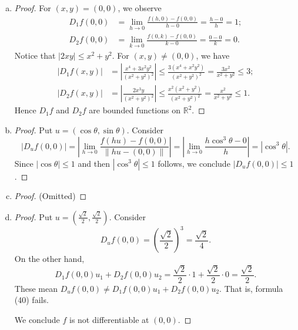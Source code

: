 \begin{Exercise}
	\begin{enumerate}[(a)]
		\item 		
		\begin{proof}
			For $(x,y) = (0,0)$, we observe
			\begin{align*}
			D_1 f(0,0) 
			&= \lim_{h\to 0} \frac{f(h,0)-f(0,0)}{h-0} 
			= \frac{h-0}{h} 
			= 1; \\
			D_2 f(0,0) 
			&= \lim_{k\to 0} \frac{f(0,k)-f(0,0)}{k-0} 
			= \frac{0-0}{k} 
			= 0.
			\end{align*}
			Notice that $|2xy| \leq x^2+y^2$.
			For $(x,y) \neq (0,0)$, we have
			\begin{align*}
			|D_1 f(x,y)|
			&= \left| \frac{x^4+3x^2 y^2}{(x^2+y^2)^2} \right|
			\leq \frac{3(x^4+x^2 y^2)}{(x^2+y^2)^2}
			= \frac{3x^2}{x^2+y^2}
			\leq 3; \\
			|D_2 f(x,y)|
			&= \left| \frac{2x^3 y}{(x^2+y^2)^2} \right|
			\leq \frac{x^2(x^2+y^2)}{(x^2+y^2)^2}
			= \frac{x^2}{x^2+y^2}
			\leq 1.
			\end{align*}
			Hence $D_1 f$ and $D_2 f$ are bounded functions on $\mathbb{R}^2$.
		\end{proof}
		
		\item
		\begin{proof}
			Put $u = (\cos \theta, \sin \theta)$.
			Consider
			$$
			|D_u f(0,0)|
			= \left| \lim_{h\to 0}\frac{f(hu) - f(0,0)}{\|hu - (0,0) \|}\right|
			= \left| \lim_{h\to 0} \frac{h\cos^3 \theta - 0}{h} \right|
			= |\cos^3 \theta|.
			$$
			Since $|\cos\theta|\leq 1$ and then $|\cos^3 \theta| \leq 1$ follows, we conclude $|D_u f(0,0)|\leq 1$.
		\end{proof}
		
		\item
		\begin{proof}
			(Omitted)
		\end{proof}
		
		\item
		\begin{proof}
			Put $u = \left(\frac{\sqrt{2}}{2}, \frac{\sqrt{2}}{2}\right)$.
			Consider
			$$
			D_u f(0,0) = \left(\frac{\sqrt{2}}{2}\right)^3
			= \frac{\sqrt{2}}{4}.
			$$
			On the other hand,
			$$
			D_1 f(0,0) u_1 + D_2 f(0,0) u_2
			= \frac{\sqrt{2}}{2}\cdot 1 + \frac{\sqrt{2}}{2}\cdot 0
			= \frac{\sqrt{2}}{2}.
			$$
			These mean $D_u f(0,0) \neq D_1 f(0,0) u_1 + D_2 f(0,0) u_2$.
			That is, formula (40) fails.
			
			We conclude $f$ is not differentiable at $(0,0)$.
		\end{proof}
	\end{enumerate}
\end{Exercise}